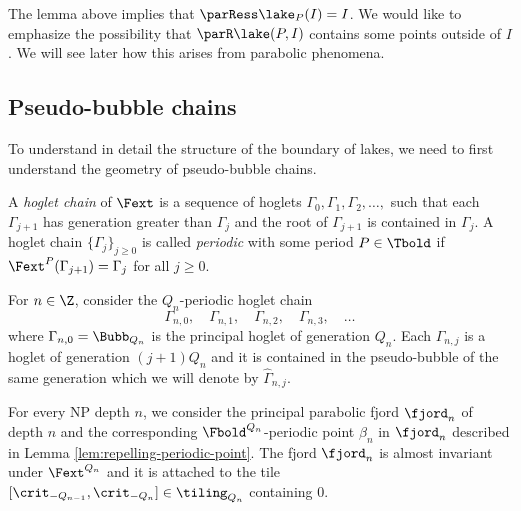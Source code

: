 \documentclass{amsart}
\begin{document}
\begin{remark}
    The lemma above implies that $\parRess \lake_P(I) = I$. 
    We would like to emphasize the possibility that $\parR \lake(P,I)$ contains some points outside of $I$.
    We will see later how this arises from parabolic phenomena.
\end{remark}

\subsection{Pseudo-bubble chains}
\label{ss:bubble-chains}

To understand in detail the structure of the boundary of lakes, we need to first understand the geometry of pseudo-bubble chains.

\begin{definition}
    A \emph{hoglet chain} of $\Fext$ is a sequence of hoglets $\Gamma_0, \Gamma_1, \Gamma_2, \ldots, $ such that each $\Gamma_{j+1}$ has generation greater than $\Gamma_{j}$ and the root of $\Gamma_{j+1}$ is contained in $\Gamma_{j}$.
    A hoglet chain $\{ \Gamma_j \}_{j \geq 0}$ is called \emph{periodic} with some period $P \in \Tbold$ if $\Fext^P(\Gamma_{j+1}) = \Gamma_j$ for all $j \geq 0$.
\end{definition}

For $n \in \Z$, consider the $Q_n$-periodic hoglet chain
\[
    \Gamma_{n,0}, \quad \Gamma_{n,1}, \quad \Gamma_{n,2}, \quad \Gamma_{n,3}, \quad \ldots
\]
where $\Gamma_{n,0} = \Bubb_{Q_n}$ is the principal hoglet of generation $Q_n$.
Each $\Gamma_{n,j}$ is a hoglet of generation $(j+1)Q_n$ and it is contained in the pseudo-bubble of the same generation which we will denote by $\hat{\Gamma}_{n,j}$.

For every NP depth $n$, we consider the principal parabolic fjord $\fjord_n$ of depth $n$ and the corresponding $\Fbold^{Q_n}$-periodic point $\beta_n$ in $\fjord_n$ described in Lemma \ref{lem:repelling-periodic-point}.
The fjord $\fjord_n$ is almost invariant under $\Fext^{Q_n}$ and it is attached to the tile $[\crit_{-Q_{n-1}},\crit_{-Q_n}] \in \tiling_{Q_n}$ containing $0$. 
\end{document}

